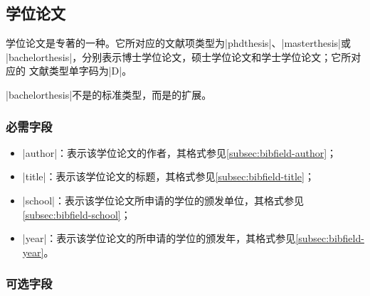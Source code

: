 
\subsection{学位论文}\label{subsec:bibtype-thesis}

学位论文是专著的一种。它所对应的{\BibTeX}文献项类型为|phdthesis|、|masterthesis|或
|bachelorthesis|，分别表示博士学位论文，硕士学位论文和学士学位论文；它所对应的
文献类型单字码为|D|\cite{gbt3469-1983}。

|bachelorthesis|不是{\BibTeX}的标准类型，而是{\njuthesis}的扩展。

\subsubsection{必需字段}

\begin{itemize}
\item |author|：表示该学位论文的作者，其格式参见\ref{subsec:bibfield-author}；
\item |title|：表示该学位论文的标题，其格式参见\ref{subsec:bibfield-title}；
\item |school|：表示该学位论文所申请的学位的颁发单位，其格式参见\ref{subsec:bibfield-school}；
\item |year|：表示该学位论文的所申请的学位的颁发年，其格式参见\ref{subsec:bibfield-year}。
\end{itemize}

\subsubsection{可选字段}

